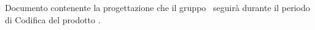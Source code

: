 Documento contenente la progettazione che il gruppo \gruppo\ seguirà durante il periodo di Codifica del prodotto \progetto.
